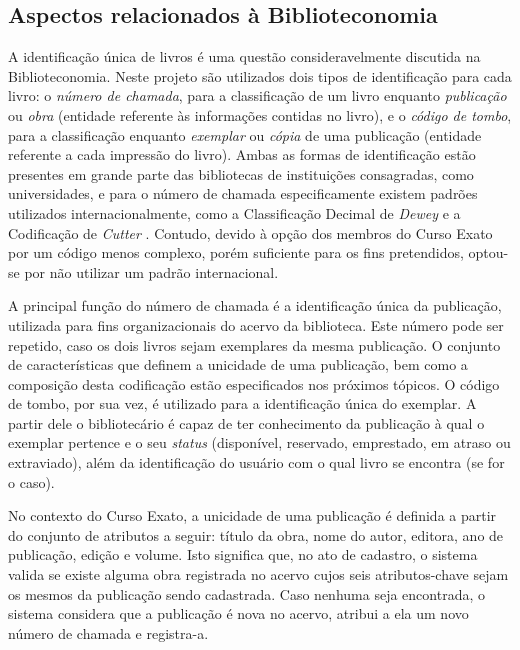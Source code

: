 \documentclass[a4paper]{article}
\begin{document}
\subsection{Aspectos relacionados à Biblioteconomia}

A identificação única de livros é uma questão consideravelmente discutida na Biblioteconomia. Neste projeto são utilizados dois tipos de identificação para cada livro: o \textit{número de chamada}, para a classificação de um livro enquanto \textit{publicação} ou \textit{obra} (entidade referente às informações contidas no livro), e o \textit{código de tombo}, para a classificação enquanto \textit{exemplar} ou \textit{cópia} de uma publicação (entidade referente a cada impressão do livro). Ambas as formas de identificação estão presentes em grande parte das bibliotecas de instituições consagradas, como universidades, e para o número de chamada especificamente existem padrões utilizados internacionalmente, como a Classificação Decimal de \textit{Dewey} \cite{dewey} e a Codificação de \textit{Cutter} \cite{cutter}. Contudo, devido à opção dos membros do Curso Exato por um código menos complexo, porém suficiente para os fins pretendidos, optou-se por não utilizar um padrão internacional. 

A principal função do número de chamada é a identificação única da publicação, utilizada para fins organizacionais do acervo da biblioteca. Este número pode ser repetido, caso os dois livros sejam exemplares da mesma publicação. O conjunto de características que definem a unicidade de uma publicação, bem como a composição desta codificação estão especificados nos próximos tópicos. O código de tombo, por sua vez, é utilizado para a identificação única do exemplar. A partir dele o bibliotecário é capaz de ter conhecimento da publicação à qual o exemplar pertence e o seu \textit{status} (disponível, reservado, emprestado, em atraso ou extraviado), além da identificação do usuário com o qual livro se encontra (se for o caso).

No contexto do Curso Exato, a unicidade de uma publicação é definida a partir do conjunto de atributos a seguir: título da obra, nome do autor, editora, ano de publicação, edição e volume. Isto significa que, no ato de cadastro, o sistema valida se existe alguma obra registrada no acervo cujos seis atributos-chave sejam os mesmos da publicação sendo cadastrada. Caso nenhuma seja encontrada, o sistema considera que a publicação é nova no acervo, atribui a ela um novo número de chamada e registra-a.
\end{document}
